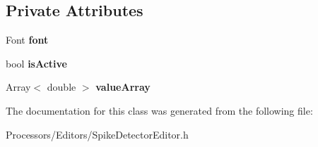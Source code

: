 \subsection*{Private Attributes}
\begin{DoxyCompactItemize}
\item 
\hypertarget{classThresholdSlider_a8a9253483d81108291ae60a4ac33e9e7}{Font {\bfseries font}}\label{classThresholdSlider_a8a9253483d81108291ae60a4ac33e9e7}

\item 
\hypertarget{classThresholdSlider_a79e4ddcfe860a4ed441f834aa28237ef}{bool {\bfseries is\-Active}}\label{classThresholdSlider_a79e4ddcfe860a4ed441f834aa28237ef}

\item 
\hypertarget{classThresholdSlider_a1e0ae8d93bca3f3321d2f051e8ec3fc6}{Array$<$ double $>$ {\bfseries value\-Array}}\label{classThresholdSlider_a1e0ae8d93bca3f3321d2f051e8ec3fc6}

\end{DoxyCompactItemize}


The documentation for this class was generated from the following file\-:\begin{DoxyCompactItemize}
\item 
Processors/\-Editors/Spike\-Detector\-Editor.\-h\end{DoxyCompactItemize}
